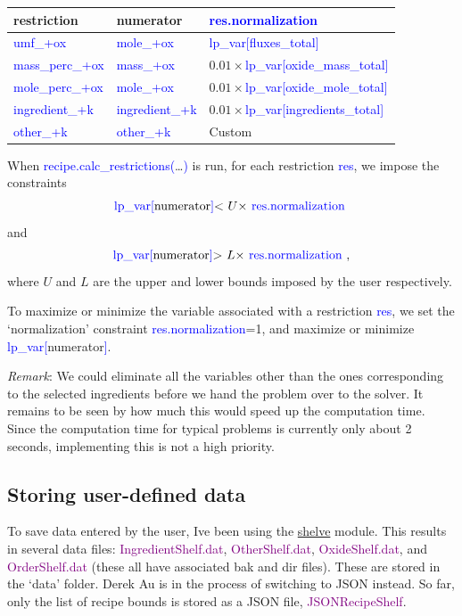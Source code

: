 \documentclass[a4paper,10pt]{article}
\def\'{\textquotesingle}
\def\tq{\textquotesingle}
\def\blue{\textcolor{blue}}
\def\green{\textcolor{Purple}}
\def\lpv{lp\_var}
\begin{document}
\begin{flushleft}
\begin{tabular}{|p{}|p{}| p{}| } \hline
 restriction                   & numerator                     & \blue{res.normalization} \\ \hline
 \blue{\tq umf\_\tq+ox}        & \blue{\tq mole\_\tq+ox} & \blue{\lpv[\tq fluxes\_total\tq]} \\ \hline
 \blue{\tq mass\_perc\_\tq+ox} & \blue{\tq mass\_\tq+ox} & $0.01\times$\blue{\lpv[\tq oxide\_mass\_total\tq]}  \\ \hline
 \blue{\tq mole\_perc\_\tq+ox} & \blue{\tq mole\_\tq+ox} & $0.01\times$\blue{\lpv[\tq oxide\_mole\_total\tq]}  \\ \hline
 \blue{\tq ingredient\_\tq+k}  & \blue{\tq ingredient\_\tq+k} & $0.01\times$\blue{\lpv[\tq ingredients\_total\tq]}  \\ \hline
 \blue{\tq other\_\tq+k}       & \blue{\tq other\_\tq+k} &  Custom \\ \hline
\end{tabular}
\end{flushleft}

When \blue{recipe.calc\_restrictions(}\ldots\blue{)} is run, for each restriction \blue{res}, we impose the constraints
$$\textnormal{\blue{\lpv[}numerator\blue{]}< $U\times$ \blue{res.normalization} }$$
and 
$$\textnormal{\blue{\lpv[}numerator\blue{]}> $L\times$ \blue{res.normalization} },$$
where $U$ and $L$ are the upper and lower bounds imposed by the user respectively.

To maximize or minimize the variable associated with a restriction \blue{res}, we set the `normalization' constraint \blue{res.normalization}=1, and maximize or minimize \blue{\lpv[}numerator\blue{]}. 

\emph{Remark}: We could eliminate all the variables other than the ones corresponding to the selected ingredients before we hand the problem over to the solver. It remains to be seen by how much this would speed up the computation time. Since the computation time for typical problems is currently only about 2 seconds, implementing this is not a high priority.

\subsection{Storing user-defined data}

To save data entered by the user, I\'ve been using the \href{https://docs.python.org/3.6/library/shelve.html}{shelve} module. This results in several data files: \green{IngredientShelf.dat}, \green{OtherShelf.dat}, \green{OxideShelf.dat}, and \green{OrderShelf.dat} (these all have associated bak and dir files). These are stored in the `data' folder. Derek Au is in the process of switching to JSON instead. So far, only the list of recipe bounds is stored as a JSON file, \green{JSONRecipeShelf}.
\end{document}

